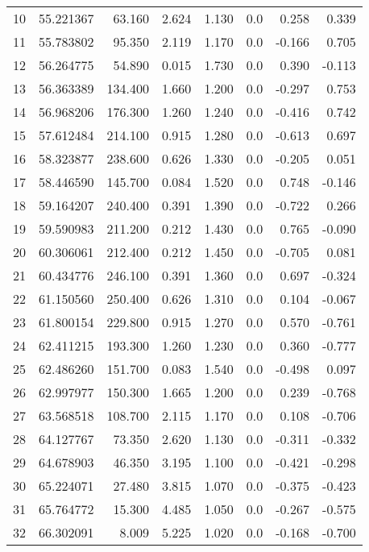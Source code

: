 {\begin{longtable}{|l||r|r|r|r|r|r|r|}
10 & 55.221367 &  63.160 &  2.624 &    1.130 & 0.0 &   0.258 &    0.339\\
11 & 55.783802 &  95.350 &  2.119 &    1.170 & 0.0 &  -0.166 &    0.705\\
12 & 56.264775 &  54.890 &  0.015 &    1.730 & 0.0 &   0.390 &   -0.113\\
13 & 56.363389 & 134.400 &  1.660 &    1.200 & 0.0 &  -0.297 &    0.753\\
14 & 56.968206 & 176.300 &  1.260 &    1.240 & 0.0 &  -0.416 &    0.742\\
15 & 57.612484 & 214.100 &  0.915 &    1.280 & 0.0 &  -0.613 &    0.697\\
16 & 58.323877 & 238.600 &  0.626 &    1.330 & 0.0 &  -0.205 &    0.051\\
17 & 58.446590 & 145.700 &  0.084 &    1.520 & 0.0 &   0.748 &   -0.146\\
18 & 59.164207 & 240.400 &  0.391 &    1.390 & 0.0 &  -0.722 &    0.266\\
19 & 59.590983 & 211.200 &  0.212 &    1.430 & 0.0 &   0.765 &   -0.090\\
20 & 60.306061 & 212.400 &  0.212 &    1.450 & 0.0 &  -0.705 &    0.081\\
21 & 60.434776 & 246.100 &  0.391 &    1.360 & 0.0 &   0.697 &   -0.324\\
22 & 61.150560 & 250.400 &  0.626 &    1.310 & 0.0 &   0.104 &   -0.067\\
23 & 61.800154 & 229.800 &  0.915 &    1.270 & 0.0 &   0.570 &   -0.761\\
24 & 62.411215 & 193.300 &  1.260 &    1.230 & 0.0 &   0.360 &   -0.777\\
25 & 62.486260 & 151.700 &  0.083 &    1.540 & 0.0 &  -0.498 &    0.097\\
26 & 62.997977 & 150.300 &  1.665 &    1.200 & 0.0 &   0.239 &   -0.768\\
27 & 63.568518 & 108.700 &  2.115 &    1.170 & 0.0 &   0.108 &   -0.706\\
28 & 64.127767 &  73.350 &  2.620 &    1.130 & 0.0 &  -0.311 &   -0.332\\
29 & 64.678903 &  46.350 &  3.195 &    1.100 & 0.0 &  -0.421 &   -0.298\\
30 & 65.224071 &  27.480 &  3.815 &    1.070 & 0.0 &  -0.375 &   -0.423\\
31 & 65.764772 &  15.300 &  4.485 &    1.050 & 0.0 &  -0.267 &   -0.575\\
32 & 66.302091 &   8.009 &  5.225 &    1.020 & 0.0 &  -0.168 &   -0.700\\

\end{longtable}}
